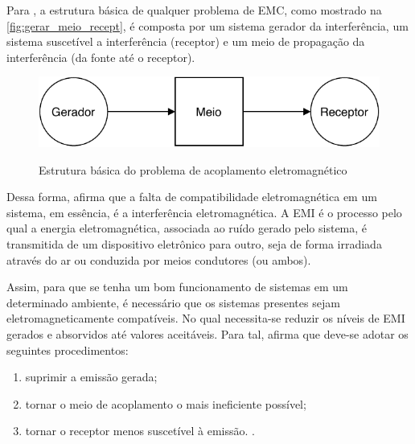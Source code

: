     Para , a estrutura básica de qualquer problema de EMC, como mostrado na \autoref{fig:gerar_meio_recept}, é composta por um sistema gerador da interferência, um sistema suscetível a interferência (receptor) e um meio de propagação da interferência (da fonte até o receptor).
    
    \begin{figure}[H]
    	\centering
    	\caption{Estrutura básica do problema de acoplamento eletromagnético}
    	\includegraphics[scale=1]{pdf/outros/gera_meio_recep.pdf}
    	\label{fig:gerar_meio_recept}
    \end{figure}
    
    Dessa forma,  afirma que a falta de compatibilidade eletromagnética em um sistema, em essência, é a interferência eletromagnética. A EMI é o processo pelo qual a energia eletromagnética, associada ao ruído gerado pelo sistema, é transmitida de um dispositivo eletrônico para outro, seja de forma irradiada através do ar ou conduzida por meios condutores (ou ambos). 
    
    Assim, para que se tenha um bom funcionamento de sistemas em um determinado ambiente, é necessário que os sistemas presentes sejam eletromagneticamente compatíveis. No qual necessita-se reduzir os níveis de EMI gerados e absorvidos até valores aceitáveis. Para tal,  afirma que deve-se adotar os seguintes procedimentos: 
    
    \begin{citacao}
        \begin{enumerate}[leftmargin=\leftskip+\labelwidth-\labelsep]
            \item suprimir a emissão gerada;
            \item tornar o meio de acoplamento o mais ineficiente possível;
            \item tornar o receptor menos suscetível à emissão. \cite[p.~4, tradução nossa]{ref:EMC_livro_Paul}.
        \end{enumerate}
    \end{citacao}
    
